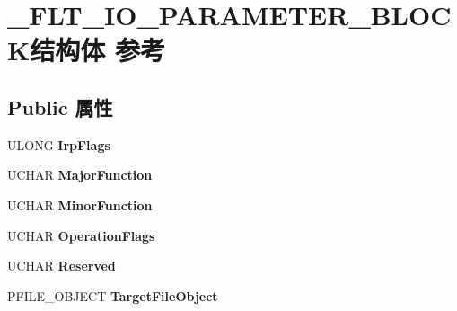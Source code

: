 \hypertarget{struct___f_l_t___i_o___p_a_r_a_m_e_t_e_r___b_l_o_c_k}{}\section{\+\_\+\+F\+L\+T\+\_\+\+I\+O\+\_\+\+P\+A\+R\+A\+M\+E\+T\+E\+R\+\_\+\+B\+L\+O\+C\+K结构体 参考}
\label{struct___f_l_t___i_o___p_a_r_a_m_e_t_e_r___b_l_o_c_k}
\subsection*{Public 属性}
\begin{DoxyCompactItemize}
\item 
\mbox{\label{struct___f_l_t___i_o___p_a_r_a_m_e_t_e_r___b_l_o_c_k_a89445480b27475b0d85e47ba32b940eb}} 
U\+L\+O\+NG {\bfseries Irp\+Flags}
\item 
\mbox{\label{struct___f_l_t___i_o___p_a_r_a_m_e_t_e_r___b_l_o_c_k_ae2bc36858f44b422318a1ef5cbdf09af}} 
U\+C\+H\+AR {\bfseries Major\+Function}
\item 
\mbox{\label{struct___f_l_t___i_o___p_a_r_a_m_e_t_e_r___b_l_o_c_k_a500e15f95afac5065e04d910ff8ac561}} 
U\+C\+H\+AR {\bfseries Minor\+Function}
\item 
\mbox{\label{struct___f_l_t___i_o___p_a_r_a_m_e_t_e_r___b_l_o_c_k_a90ae68baa48169c205310dd4035c9d30}} 
U\+C\+H\+AR {\bfseries Operation\+Flags}
\item 
\mbox{\label{struct___f_l_t___i_o___p_a_r_a_m_e_t_e_r___b_l_o_c_k_aa8215b7b14a460ca32dcbf8cec89b36b}} 
U\+C\+H\+AR {\bfseries Reserved}
\item 
\mbox{\label{struct___f_l_t___i_o___p_a_r_a_m_e_t_e_r___b_l_o_c_k_a5972a1e046186ab12ef81aecc4e697cc}} 
P\+F\+I\+L\+E\+\_\+\+O\+B\+J\+E\+CT {\bfseries Target\+File\+Object}
\item 

\end{DoxyCompactItemize}
